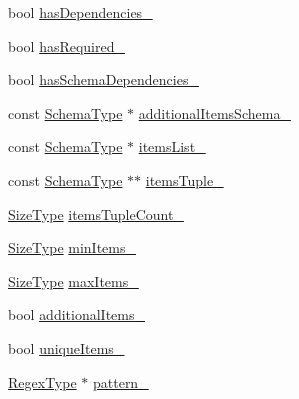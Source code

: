 \begin{DoxyCompactItemize}
\item 
bool \mbox{\hyperlink{classrapidjson_1_1internal_1_1_schema_aa37a04b7e9de07e9c1cf3b60e139e805}{has\+Dependencies\+\_\+}}
\item 
bool \mbox{\hyperlink{classrapidjson_1_1internal_1_1_schema_a7bdcaa4b92a5632699bec9fc1678923d}{has\+Required\+\_\+}}
\item 
bool \mbox{\hyperlink{classrapidjson_1_1internal_1_1_schema_ab366e6b69bfb9c9bce2899e845a7c7fd}{has\+Schema\+Dependencies\+\_\+}}
\item 
const \mbox{\hyperlink{classrapidjson_1_1internal_1_1_schema_a62e03be17971648a9d614244ffcb0f10}{Schema\+Type}} $\ast$ \mbox{\hyperlink{classrapidjson_1_1internal_1_1_schema_ac1d37abd0920873bf8409370bd177fa2}{additional\+Items\+Schema\+\_\+}}
\item 
const \mbox{\hyperlink{classrapidjson_1_1internal_1_1_schema_a62e03be17971648a9d614244ffcb0f10}{Schema\+Type}} $\ast$ \mbox{\hyperlink{classrapidjson_1_1internal_1_1_schema_a6220c291625076038991645091f23398}{items\+List\+\_\+}}
\item 
const \mbox{\hyperlink{classrapidjson_1_1internal_1_1_schema_a62e03be17971648a9d614244ffcb0f10}{Schema\+Type}} $\ast$$\ast$ \mbox{\hyperlink{classrapidjson_1_1internal_1_1_schema_a19125ba0e545f043d5657524c7129a4d}{items\+Tuple\+\_\+}}
\item 
\mbox{\hyperlink{namespacerapidjson_a44eb33eaa523e36d466b1ced64b85c84}{Size\+Type}} \mbox{\hyperlink{classrapidjson_1_1internal_1_1_schema_ad8031fa714cfb3c798393d026180e337}{items\+Tuple\+Count\+\_\+}}
\item 
\mbox{\hyperlink{namespacerapidjson_a44eb33eaa523e36d466b1ced64b85c84}{Size\+Type}} \mbox{\hyperlink{classrapidjson_1_1internal_1_1_schema_a610be411821cbc1240d725cbf95f3748}{min\+Items\+\_\+}}
\item 
\mbox{\hyperlink{namespacerapidjson_a44eb33eaa523e36d466b1ced64b85c84}{Size\+Type}} \mbox{\hyperlink{classrapidjson_1_1internal_1_1_schema_aa73917ad23bab03bd917dbb2bf5d182f}{max\+Items\+\_\+}}
\item 
bool \mbox{\hyperlink{classrapidjson_1_1internal_1_1_schema_a4c25a27504d7f76db1e9a549852d9c97}{additional\+Items\+\_\+}}
\item 
bool \mbox{\hyperlink{classrapidjson_1_1internal_1_1_schema_a9ac848a216c53f286902cce6fae2d409}{unique\+Items\+\_\+}}
\item 
\mbox{\hyperlink{classrapidjson_1_1internal_1_1_schema_a2c16b06523df78f5c354e9a68da90e23}{Regex\+Type}} $\ast$ \mbox{\hyperlink{classrapidjson_1_1internal_1_1_schema_ae8306d996b2144b563f508f8fe7ae8ba}{pattern\+\_\+}}
$$
\end{DoxyCompactItemize}
